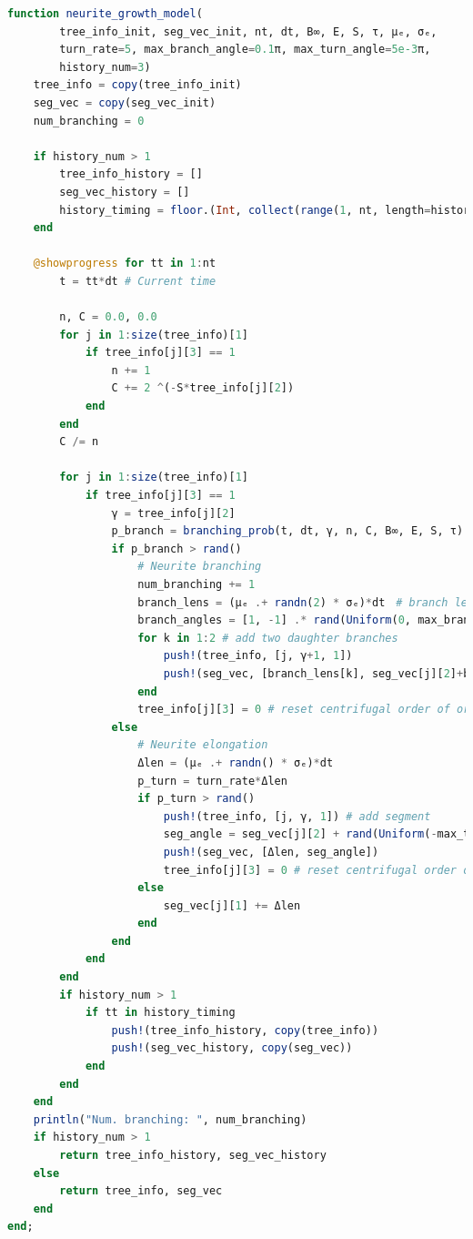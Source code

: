 \begin{lstlisting}[language=julia]
function neurite_growth_model(
        tree_info_init, seg_vec_init, nt, dt, B∞, E, S, τ, μₑ, σₑ,
        turn_rate=5, max_branch_angle=0.1π, max_turn_angle=5e-3π,
        history_num=3)
    tree_info = copy(tree_info_init)
    seg_vec = copy(seg_vec_init)
    num_branching = 0
    
    if history_num > 1
        tree_info_history = []
        seg_vec_history = []
        history_timing = floor.(Int, collect(range(1, nt, length=history_num+1)))[2:end] 
    end
    
    @showprogress for tt in 1:nt
        t = tt*dt # Current time
        
        n, C = 0.0, 0.0
        for j in 1:size(tree_info)[1]
            if tree_info[j][3] == 1
                n += 1
                C += 2 ^(-S*tree_info[j][2])
            end
        end
        C /= n
        
        for j in 1:size(tree_info)[1]
            if tree_info[j][3] == 1
                γ = tree_info[j][2]
                p_branch = branching_prob(t, dt, γ, n, C, B∞, E, S, τ)
                if p_branch > rand()
                    # Neurite branching
                    num_branching += 1
                    branch_lens = (μₑ .+ randn(2) * σₑ)*dt　# branch length
                    branch_angles = [1, -1] .* rand(Uniform(0, max_branch_angle), 2)
                    for k in 1:2 # add two daughter branches
                        push!(tree_info, [j, γ+1, 1]) 
                        push!(seg_vec, [branch_lens[k], seg_vec[j][2]+branch_angles[k]])
                    end
                    tree_info[j][3] = 0 # reset centrifugal order of original branch
                else
                    # Neurite elongation
                    Δlen = (μₑ .+ randn() * σₑ)*dt
                    p_turn = turn_rate*Δlen
                    if p_turn > rand()
                        push!(tree_info, [j, γ, 1]) # add segment
                        seg_angle = seg_vec[j][2] + rand(Uniform(-max_turn_angle, max_turn_angle))
                        push!(seg_vec, [Δlen, seg_angle])
                        tree_info[j][3] = 0 # reset centrifugal order of original branch
                    else
                        seg_vec[j][1] += Δlen
                    end
                end
            end
        end
        if history_num > 1
            if tt in history_timing
                push!(tree_info_history, copy(tree_info))
                push!(seg_vec_history, copy(seg_vec))
            end
        end
    end
    println("Num. branching: ", num_branching)
    if history_num > 1
        return tree_info_history, seg_vec_history
    else
        return tree_info, seg_vec
    end
end;
\end{lstlisting}
